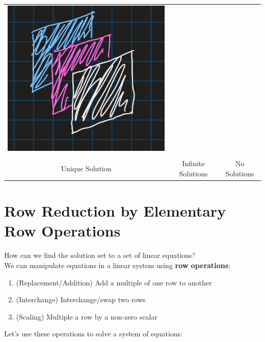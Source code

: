 \documentclass{article}
\begin{document}
\begin{tabular}{ c c c }
    \includegraphics[scale=0.25]{Images/1.1.graph6.png} \\
    \\
    Unique Solution &
    Infinite Solutions &
    No Solutions \\
\end{tabular}

\section{Row Reduction by Elementary Row Operations}
How can we find the solution set to a set of linear equations?
\\
We can manipulate equations in a linear system using \textbf{row operations}:
\begin{enumerate}
    \item (Replacement/Addition) Add a multiple of one row to another
    \item (Interchange) Interchange/swap two rows
    \item (Scaling) Multiple a row by a non-zero scalar
\end{enumerate}
Let's use these operations to solve a system of equations:
\end{document}
